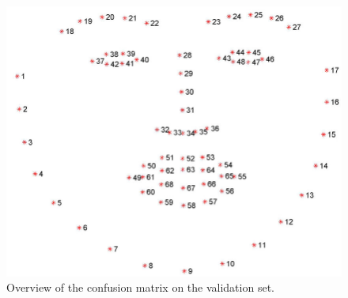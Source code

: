 \begin{figure}[ht]
  \centering
   \includegraphics[width=\linewidth]{visual.png}
   \caption{Overview of the confusion matrix on the validation set.} 
   \label{fig:visual}
\end{figure}

\newpage

